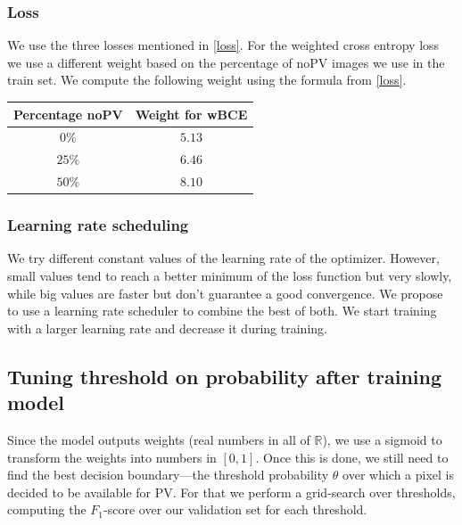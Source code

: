 \documentclass[10pt,conference]{IEEEtran}
\begin{document}
\subsubsection{Loss}
We use the three losses mentioned in \autoref{loss}. For the weighted cross entropy loss we use a different weight based on the percentage of noPV images we use in the train set. We compute the following weight using the formula from \autoref{loss}.
\begin{center}
    \begin{tabular}{||c | c||} 
        \hline
        Percentage noPV & Weight for wBCE\\ [0.5ex] 
        \hline\hline
        $0\%$ & $5.13$ \\
        \hline
        $25\%$ & $6.46$ \\
        \hline
        $50\%$ & $8.10$ \\
        \hline
    \end{tabular}
\end{center}

\subsubsection{Learning rate scheduling}
We try different constant values of the learning rate of the optimizer. However, small values tend to reach a better minimum of the loss function but very slowly, while big values are faster but don't guarantee a good convergence. We propose to use a learning rate scheduler to combine the best of both. We start training with a larger learning rate and decrease it during training.

\subsection{Tuning threshold on probability after training model} \label{ssec:threshold}
Since the model outputs weights (real numbers in all of $\mathbb{R}$),
we use a sigmoid to transform the weights into numbers in $[0,1]$.
Once this is done, we still need to find the best decision boundary---the threshold probability $\theta$ over which a pixel is decided to be available for PV.
For that we perform a grid-search over thresholds, computing the $F_1$-score over our validation set 
for each threshold.
\end{document}
